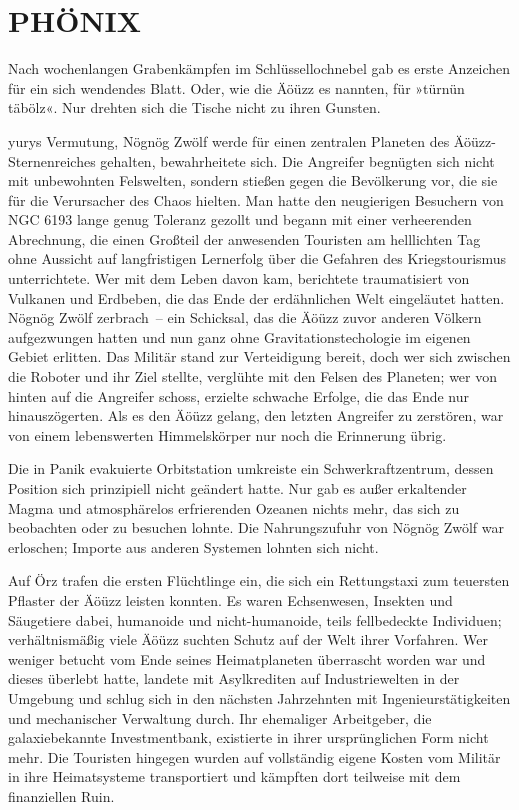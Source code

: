 \chapter{PHÖNIX}

Nach wochenlangen Grabenkämpfen im Schlüssellochnebel gab es erste Anzeichen für ein sich wendendes Blatt. Oder, wie die Äöüzz es nannten, für »türnün täbölz«. Nur drehten sich die Tische nicht zu ihren Gunsten.

yurys Vermutung, Nögnög Zwölf werde für einen zentralen Planeten des Äöüzz-Sternenreiches gehalten, bewahrheitete sich. Die Angreifer begnügten sich nicht mit unbewohnten Felswelten, sondern stießen gegen die Bevölkerung vor, die sie für die Verursacher des Chaos hielten. Man hatte den neugierigen Besuchern von NGC 6193 lange genug Toleranz gezollt und begann mit einer verheerenden Abrechnung, die einen Großteil der anwesenden Touristen am helllichten Tag ohne Aussicht auf langfristigen Lernerfolg über die Gefahren des Kriegstourismus unterrichtete. Wer mit dem Leben davon kam, berichtete traumatisiert von Vulkanen und Erdbeben, die das Ende der erdähnlichen Welt eingeläutet hatten. Nögnög Zwölf zerbrach~– ein Schicksal, das die Äöüzz zuvor anderen Völkern aufgezwungen hatten und nun ganz ohne Gravitationstechologie im eigenen Gebiet erlitten. Das Militär stand zur Verteidigung bereit, doch wer sich zwischen die Roboter und ihr Ziel stellte, verglühte mit den Felsen des Planeten; wer von hinten auf die Angreifer schoss, erzielte schwache Erfolge, die das Ende nur hinauszögerten. Als es den Äöüzz gelang, den letzten Angreifer zu zerstören, war von einem lebenswerten Himmelskörper nur noch die Erinnerung übrig.

Die in Panik evakuierte Orbitstation umkreiste ein Schwerkraftzentrum, dessen Position sich prinzipiell nicht geändert hatte. Nur gab es außer erkaltender Magma und atmosphärelos erfrierenden Ozeanen nichts mehr, das sich zu beobachten oder zu besuchen lohnte. Die Nahrungszufuhr von Nögnög Zwölf war erloschen; Importe aus anderen Systemen lohnten sich nicht.

Auf Örz trafen die ersten Flüchtlinge ein, die sich ein Rettungstaxi zum teuersten Pflaster der Äöüzz leisten konnten. Es waren Echsenwesen, Insekten und Säugetiere dabei, humanoide und nicht-humanoide, teils fellbedeckte Individuen; verhältnismäßig viele Äöüzz suchten Schutz auf der Welt ihrer Vorfahren. Wer weniger betucht vom Ende seines Heimatplaneten überrascht worden war und dieses überlebt hatte, landete mit Asylkrediten auf Industriewelten in der Umgebung und schlug sich in den nächsten Jahrzehnten mit Ingenieurstätigkeiten und mechanischer Verwaltung durch. Ihr ehemaliger Arbeitgeber, die galaxiebekannte Investmentbank, existierte in ihrer ursprünglichen Form nicht mehr. Die Touristen hingegen wurden auf vollständig eigene Kosten vom Militär in ihre Heimatsysteme transportiert und kämpften dort teilweise mit dem finanziellen Ruin.

